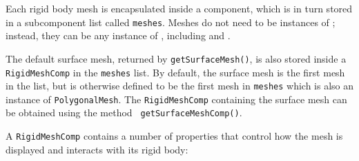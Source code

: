 Each rigid body mesh is encapsulated inside a
 component, which is in turn stored in
a subcomponent list called {\tt meshes}. Meshes do not need to be
instances of ; instead,
they can be any instance of ,
including  and
.

\begin{sideblock}
The default surface mesh, returned by {\tt getSurfaceMesh()}, is also
stored inside a {\tt RigidMeshComp} in the {\tt meshes} list. By
default, the surface mesh is the first mesh in the list, but is
otherwise defined to be the first mesh in {\tt meshes} which is also
an instance of {\tt PolygonalMesh}. The {\tt RigidMeshComp} containing
the surface mesh can be obtained using the method {\tt
getSurfaceMeshComp()}.
\end{sideblock}

A {\tt RigidMeshComp} contains a number of properties that control how
the mesh is displayed and interacts with its rigid body:

